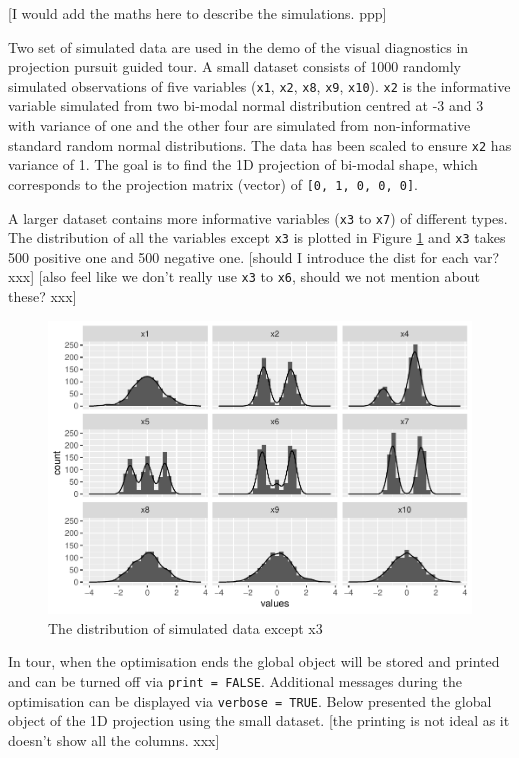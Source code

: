 \documentclass[12pt]{article}
\begin{document}
{[}I would add the maths here to describe the simulations. ppp{]}

Two set of simulated data are used in the demo of the visual diagnostics
in projection pursuit guided tour. A small dataset consists of 1000
randomly simulated observations of five variables (\texttt{x1},
\texttt{x2}, \texttt{x8}, \texttt{x9}, \texttt{x10}). \texttt{x2} is the
informative variable simulated from two bi-modal normal distribution
centred at -3 and 3 with variance of one and the other four are
simulated from non-informative standard random normal distributions. The
data has been scaled to ensure \texttt{x2} has variance of 1. The goal
is to find the 1D projection of bi-modal shape, which corresponds to the
projection matrix (vector) of \texttt{{[}0,\ 1,\ 0,\ 0,\ 0{]}}.

A larger dataset contains more informative variables (\texttt{x3} to
\texttt{x7}) of different types. The distribution of all the variables
except \texttt{x3} is plotted in Figure \ref{origin-data} and
\texttt{x3} takes 500 positive one and 500 negative one. {[}should I
introduce the dist for each var? xxx{]} {[}also feel like we don't
really use \texttt{x3} to \texttt{x6}, should we not mention about
these? xxx{]}

\begin{figure}
\centering
\includegraphics{paper_files/figure-latex/origin-data-1.pdf}
\caption{\label{origin-data} The distribution of simulated data except
x3}
\end{figure}

In tour, when the optimisation ends the global object will be stored and
printed and can be turned off via \texttt{print\ =\ FALSE}. Additional
messages during the optimisation can be displayed via
\texttt{verbose\ =\ TRUE}. Below presented the global object of the 1D
projection using the small dataset. {[}the printing is not ideal as it
doesn't show all the columns. xxx{]}
\end{document}

